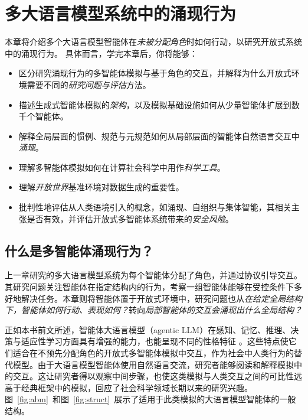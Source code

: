 \chapter{多大语言模型系统中的涌现行为}\label{chap:emergent}

\begin{learningbox}
本章将介绍多个大语言模型智能体在{\em 未被分配角色}时如何行动，以研究开放式系统中的涌现行为。
具体而言，学完本章后，你将能够：
\begin{itemize}[leftmargin=*, nosep]
    \item 区分研究涌现行为的多智能体模拟与基于角色的交互，并解释为什么开放式环境需要不同的{\em 研究问题与评估}方法。
    \item 描述生成式智能体模拟的{\em 架构}，以及模拟基础设施如何从少量智能体扩展到数千个智能体。
    \item 解释全局层面的惯例、规范与元规范如何从局部层面的智能体自然语言交互中{\em 涌现}。
    \item 理解多智能体模拟如何在计算社会科学中用作{\em 科学工具}。
    \item 理解{\em 开放世界}基准环境对数据生成的重要性。
    \item 批判性地评估从人类语境引入的概念，如涌现、自组织与集体智能，其相关主张是否有效，并评估开放式多智能体系统带来的{\em 安全风险}。
\end{itemize}
\end{learningbox}

\section{什么是多智能体涌现行为？}\label{sec:interacting}
上一章研究的多大语言模型系统为每个智能体分配了角色，并通过协议引导交互。其研究问题关注智能体在指定结构内的行为，考察一组智能体能够在受控条件下多好地解决任务。本章则将智能体置于开放式环境中，研究问题也从\emph{在给定全局结构下，智能体如何行动、表现如何？}转向\emph{局部智能体的交互会涌现出什么全局结构？}

正如本书前文所述，智能体大语言模型（agentic LLM）在感知、记忆、推理、决策与适应性学习方面具有增强的能力，也能呈现不同的性格特征 \citep{gao2023s, gao2024large}。这些特点使它们适合在不预先分配角色的开放式多智能体模拟中交互，作为社会中人类行为的替代模型。由于大语言模型智能体使用自然语言交流，研究者能够阅读和解释模拟中的交互。这让研究者得以观察中间步骤，也使这类模拟与人类交互之间的可比性远高于经典框架中的模拟，回应了社会科学领域长期以来的研究兴趣。图~\ref{fig:abm}~和图~\ref{fig:struct}~展示了适用于此类模拟的大语言模型智能体的一般结构。

